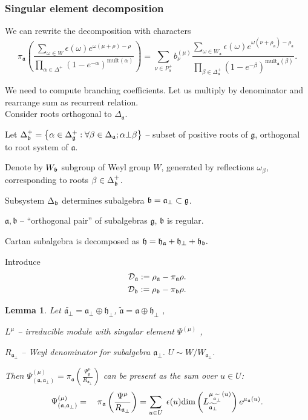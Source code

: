 \documentclass[pdftex]{beamer}
\newtheorem{mylemma}[theorem]{Lemma}
\newcommand{\gf}{\mathfrak{g}}
\newcommand{\af}{\mathfrak{a}}
\newcommand{\bff}{\mathfrak{b}}
\newcommand{\afb}{\mathfrak{a}_{\bot}}
\newcommand{\hf}{\mathfrak{h}}
\theoremstyle{definition} \newtheorem{Def}{Definition}
\begin{document}
\begin{frame}
  \frametitle{Singular element decomposition}
  We can rewrite the decomposition with characters
  \begin{equation*}
\pi _{\af}\left( \frac{\sum_{\omega \in W}\epsilon (\omega )e^{\omega (\mu +\rho )-\rho }}
  {\prod_{\alpha \in \Delta ^{+}}(1-e^{-\alpha })^{\mathrm{mult}(\alpha )}}\right) =
\sum_{\nu \in P_{\af}^{+}}b_{\nu }^{(\mu )}
\frac{\sum_{\omega \in W_{\af}}\epsilon (\omega )e^{\omega (\nu +\rho _{\af})-\rho _{\af}}}
{\prod_{\beta \in \Delta _{\af}^{+}}(1-e^{-\beta })^{\mathrm{mult}_{\af}(\beta )}}.  
\end{equation*}

We need to compute branching coefficients. Let us multiply by denominator and rearrange sum as recurrent relation. \\

Consider roots orthogonal to $\Delta_{\af}$.

Let $\Delta^{+}_{\frak{b}}=\left\{\alpha\in \Delta^{+}_{\frak{g}}:\forall
\beta\in\Delta_{\af} ; \alpha\bot \beta\right\}$ -- subset of positive roots of $\gf$, orthogonal to root system of  $\af$.

Denote by  $W_{\frak{b}}$  subgroup of Weyl group $W$, generated by reflections  $\omega _{\beta }$, corresponding to roots $\beta \in \Delta
_{\frak{b}}^{+}$.

Subsystem $\Delta _{\frak{b}}$ determines subalgebra $\frak{b}=\afb\subset\gf$.
\end{frame}
\begin{frame}
  
$\af, \mathfrak{b}$ -- ``orthogonal pair'' of subalgebras $\gf$, $\bff$ is regular.

Cartan subalgebra is decomposed as 
$\frak{{h}=\frak{h}_{\af}+\frak{h}_{\bot}+\frak{h}_{\frak{b}}.}$

Introduce
\begin{eqnarray*}
\mathcal{D}_{\af} :=\rho_{\af}-\pi_{\af}\rho.\\
\mathcal{D}_{\frak{b}} :=\rho_{\frak{b}}-\pi_{\frak{b}}\rho.
\end{eqnarray*}
\begin{mylemma}
\label{lemma}
Let  $\widetilde{\afb}=\afb\oplus \hf_{\perp }$, $\widetilde{\af}=\af\oplus\hf_{\perp }$ ,

$L^{\mu }$ -- irreducible module with singular element $\Psi ^{\left(\mu \right)}$ ,

$R_{\af_{\perp }}$ -- Weyl denominator for subalgebra $\af_{\perp }$. $U\sim W/W_{\afb}$.

Then  $\Psi ^{\left( \mu \right) }_{\left(  \af, \afb \right)}=\pi _{\af}\left( \frac{\Psi _{\gf}^{\mu }}{R_{\af_{\perp }}}\right) $ can be present as the sum over  $u\in U$:
\begin{equation*}
\Psi ^{\left( \mu \right) }_{\left(  \af, \afb \right)}=\quad \pi _{\af}\left( \frac{\Psi^{\mu }}{R_{\af%
_{\perp }}}\right) =\sum_{u\in U}\;\epsilon (u)\mathrm{\dim }
\left( L_{\widetilde{\af_{\perp }}}^{\mu _{%
\widetilde{\af_{\perp }}}\left( u\right) }\right) e^{\mu _{\af}\left( u \right) }.
\end{equation*}
\end{mylemma}
\end{frame}
\end{document}

